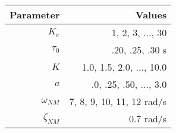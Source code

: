 \begin{tabular}{*{2}{r}}
    \toprule
    Parameter & Values \\
    \midrule
    $K_e$         & 1, 2, 3, $\ldots$, 30         \\
    $\tau_0$      & .20, .25, .30 s             \\
    $K$           & 1.0, 1.5, 2.0, $\ldots$, 10.0 \\
    $a$           & .0, .25, .50, $\ldots$, 3.0   \\
    $\omega_{NM}$ & 7, 8, 9, 10, 11, 12 rad/s   \\
    $\zeta_{NM}$  & 0.7 rad/s \\
    \bottomrule
\end{tabular}
